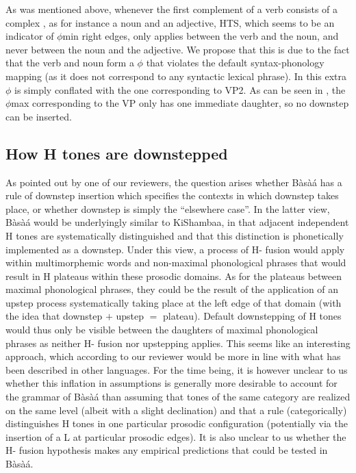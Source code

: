 \documentclass[output=paper,newtxmath,modfonts,nonflat]{langsci/langscibook}
\begin{document}
\noindent As was mentioned above, whenever the first complement of a verb consists of a complex , as for instance a noun and an adjective, HTS, which seems to be an indicator of $\phi$min right edges, only applies between the verb and the noun, and never between the noun and the adjective. We propose that this is due to the fact that the verb and noun form a $\phi$ that violates the default syntax-phonology mapping (as it does not correspond to any syntactic lexical phrase). In  this extra $\phi$ is simply conflated with the one corresponding to VP2. As can be seen in , the $\phi$max corresponding to the VP only has one immediate daughter, so no downstep can be inserted.


\subsection{How H tones are downstepped}

As pointed out by one of our reviewers, the question arises whether Bàsà{á} has a rule of downstep insertion which specifies the contexts in which downstep takes place, or whether downstep is simply the ``elsewhere case''. In the latter view, Bàsà{á} would be underlyingly similar to KiShambaa, in that adjacent independent H tones are systematically distinguished and that this distinction is phonetically implemented as a downstep. Under this view, a process of H- fusion \citep{Odden82, Bickmore00} would apply within multimorphemic words and non-maximal phonological phrases that would result in H  plateaus within these prosodic domains. As for the plateaus between maximal phonological phrases, they could be the result of the application of an upstep process systematically taking place at the left edge of that domain (with the idea that downstep $+$ upstep $=$ plateau). Default downstepping of H tones would thus only be visible between the daughters of maximal phonological phrases as neither H- fusion nor upstepping applies. This seems like an interesting approach, which according to our reviewer would be more in line with what has been described in other  languages. For the time being, it is however unclear to us whether this inflation in assumptions is generally more desirable to account for the grammar of Bàsà{á} than assuming that  tones of the same category are realized on the same level (albeit with a slight declination) and that a rule (categorically) distinguishes H tones in one particular prosodic configuration (potentially via the insertion of a L  at particular prosodic edges). It is also unclear to us whether the H- fusion hypothesis makes any empirical predictions that could be tested in Bàsà{á}.
\end{document}

